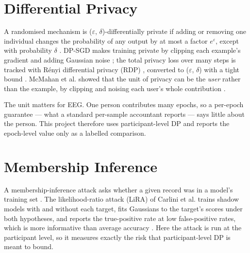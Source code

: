 \documentclass[12pt,a4paper,oneside]{report}
\begin{document}
\section{Differential Privacy}
A randomised mechanism is ($\varepsilon$, $\delta$)-differentially private if adding or removing one individual changes the probability of any output by at most a factor $e^{\varepsilon}$, except with probability $\delta$ \cite{dwork}. DP-SGD makes training private by clipping each example's gradient and adding Gaussian noise \cite{abadi}; the total privacy loss over many steps is tracked with Rényi differential privacy (RDP) \cite{rdp}, converted to ($\varepsilon$, $\delta$) with a tight bound \cite{balle}. McMahan et al. showed that the unit of privacy can be the \emph{user} rather than the example, by clipping and noising each user's whole contribution \cite{userdp}.

The unit matters for EEG. One person contributes many epochs, so a per-epoch guarantee --- what a standard per-sample accountant reports --- says little about the person. This project therefore uses participant-level DP and reports the epoch-level value only as a labelled comparison.


\section{Membership Inference}
A membership-inference attack asks whether a given record was in a model's training set \cite{shokri}. The likelihood-ratio attack (LiRA) of Carlini et al. trains shadow models with and without each target, fits Gaussians to the target's scores under both hypotheses, and reports the true-positive rate at low false-positive rates, which is more informative than average accuracy \cite{lira}. Here the attack is run at the participant level, so it measures exactly the risk that participant-level DP is meant to bound.
\end{document}

